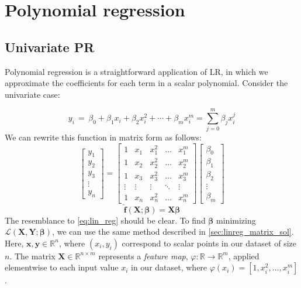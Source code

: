 \section{Polynomial regression}\label{sec:poly_reg}

\subsection{Univariate PR}

Polynomial regression is a straightforward application of LR, in which we approximate the coefficients for each term in a scalar polynomial. Consider the univariate case:

\begin{equation}
y_i \,=\, \beta_0 + \beta_1 x_i + \beta_2 x_i^2 + \cdots + \beta_m x_i^m = \sum_{j=0}^{m} \beta_j x_i^{j}
\end{equation}
%
We can rewrite this function in matrix form as follows:
%
\begin{equation}
\begin{bmatrix} y_1\\ y_2\\ y_3 \\ \vdots \\ y_n \end{bmatrix}= \begin{bmatrix} 1 & x_1 & x_1^2 & \dots & x_1^m \\ 1 & x_2 & x_2^2 & \dots & x_2^m \\ 1 & x_3 & x_3^2 & \dots & x_3^m \\ \vdots & \vdots & \vdots & \ddots & \vdots \\ 1 & x_n & x_n^2 & \dots & x_n^m \end{bmatrix} \begin{bmatrix} \beta_0\\ \beta_1\\ \beta_2\\ \vdots \\ \beta_m \end{bmatrix}
\end{equation}
%
\begin{equation}
\mathbf{\hat f}(\mathbf{X}; \bm\beta) = \mathbf{X}\bm\beta
\end{equation}
%
The resemblance to \autoref{eq:lin_reg} should be clear. To find $\bm\beta$ minimizing $\mathcal L(\mathbf{X}, \mathbf{Y};\bm\beta)$, we can use the same method described in \autoref{sec:linreg_matrix_sol}. Here, $\mathbf x, \mathbf y \in \mathbb R^n$, where $(x_i, y_i)$ correspond to scalar points in our dataset of size $n$. The matrix $\mathbf X \in \mathbb R^{n\times m}$ represents a \textit{feature map}, $\varphi: \mathbb R \rightarrow \mathbb R^m$, applied elementwise to each input value $x_i$ in our dataset, where $\varphi(x_i) = \left[1, x_i^2, \ldots, x_i^m\right]$.

